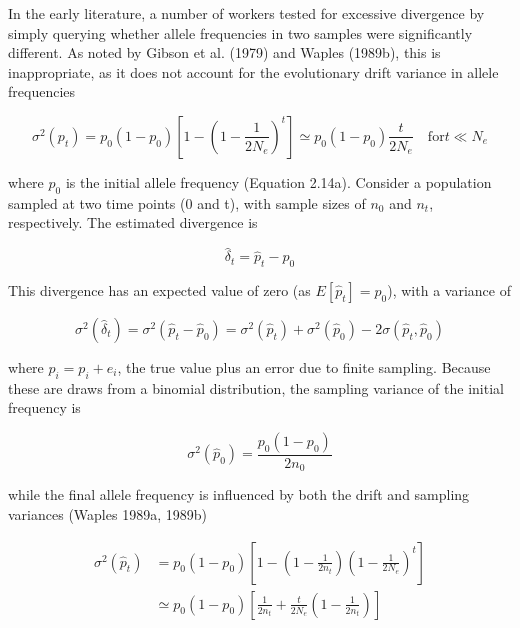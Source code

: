 \documentclass{article}
\begin{document}
In the early literature, a number of workers tested for excessive divergence by simply querying whether allele frequencies in two samples were significantly different. As noted by Gibson et al. (1979) and Waples (1989b), this is inappropriate, as it does not account for the evolutionary drift variance in allele frequencies

\begin{equation}
\sigma^{2}(p_{t})=p_{0}(1-p_{0})\left[1-\left(1-\frac{1}{2N_{e}}\right)^{t}\right]\simeq p_{0}(1-p_{0})\frac{t}{2N_{e}}\quad\mathrm{f o r}t\ll N_{e}
\end{equation}

where  $ p_{0} $ is the initial allele frequency (Equation 2.14a). Consider a population sampled at two time points (0 and t), with sample sizes of  $ n_{0} $ and  $ n_{t} $, respectively. The estimated divergence is

\begin{equation}
\widehat{\delta}_{t}=\widehat{p}_{t}-\widehat{p}_{0}
\tag{9.1a}
\label{eq:9_1a}
\end{equation}

This divergence has an expected value of zero (as  $ E[\widehat{p}_{t}] = p_{0} $), with a variance of

\begin{equation}
\sigma^{2}\left(\widehat{\delta}_{t}\right)=\sigma^{2}\left(\widehat{p}_{t}-\widehat{p}_{0}\right)=\sigma^{2}\left(\widehat{p}_{t}\right)+\sigma^{2}\left(\widehat{p}_{0}\right)-2\sigma\left(\widehat{p}_{t},\widehat{p}_{0}\right)
\tag{9.1b}
\label{eq:9_1b}
\end{equation}

where  $ \widehat{p}_{i}=p_{i}+e_{i} $, the true value plus an error due to finite sampling. Because these are draws from a binomial distribution, the sampling variance of the initial frequency is

\begin{equation}
\sigma^{2}\left(\widehat{p}_{0}\right)=\frac{p_{0}\left(1-p_{0}\right)}{2n_{0}}
\tag{9.2a}
\label{eq:9_2a}
\end{equation}

while the final allele frequency is influenced by both the drift and sampling variances (Waples 1989a, 1989b)

\begin{equation}
\begin{align*}\sigma^{2}\left(\widehat{p}_{t}\right)&=p_{0}(1-p_{0})\left[1-\left(1-\frac{1}{2n_{t}}\right)\left(1-\frac{1}{2N_{e}}\right)^{t}\right]\\&\simeq p_{0}(1-p_{0})\left[\frac{1}{2n_{t}}+\frac{t}{2N_{e}}\left(1-\frac{1}{2n_{t}}\right)\right]\end{align*}
\tag{9.2b}
\label{eq:9_2b}
\end{equation}
\end{document}
